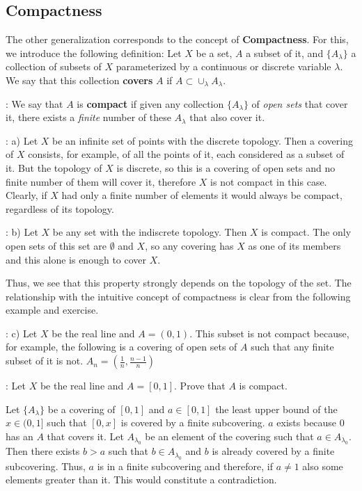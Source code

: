 \subsection{Compactness}

The other generalization corresponds to the concept of {\bf Compactness}.
For this, we introduce the following definition:
Let $X$ be a set, $A$ a subset of it, and $\{ A_{\lambda} \}$
a collection of subsets of $X$ parameterized by a continuous
or discrete variable $\lambda$. We say that this collection {\bf covers}
$A$ if $A \subset \cup_{\lambda}A_{\lambda}$.

: We say that $A$ is {\bf compact} if given any collection
$\{A_{\lambda}\}$ of {\it open sets} that cover it, there exists a {\it finite}
number of these $A_{\lambda}$ that also cover it.

\ejem: a) Let $X$ be an infinite set of points with the discrete topology.
Then a covering of $X$ consists, for example, of all the
points of it, each considered as a subset of it. But the topology of $X$ is
discrete, so this is a covering of open sets and no finite number of them
will cover it, therefore $X$ is not compact in this case.
Clearly, if $X$ had only a finite number of elements
it would always be compact, regardless of its topology.

\ejem: b) Let $X$ be any set with the indiscrete topology.
Then $X$ is compact. The only open sets of this set are
$\emptyset$ and $X$, so any covering has $X$ as
one of its members and this alone is enough to cover $X$.

Thus, we see that this property strongly depends on the topology
of the set. The relationship with the intuitive concept of compactness
is clear from the following example and exercise.

\ejem: c) Let $X$ be the real line and $A = (0,1)$. This subset is not compact
because, for example, the following is a covering of open sets of $A$ such that
any finite subset of it is not. $A_n = (\frac{1}{n}, \frac{n-1}{n})$

\ejer: Let $X$ be the real line and $A = [0,1]$. Prove that $A$ is compact.

\bpru

Let $\{A_{\lambda}\}$ be a covering of $[0,1]$ and $a \in [0,1]$ the least upper bound 
of the $x \in (0,1]$ such that $[0,x]$ is covered by a finite subcovering. 
$a$ exists because $0$ has an $A$ that covers it. Let $A_{\lambda_0}$ be an element of the covering
such that $a \in A_{\lambda_0}$. Then there exists $b > a$ such that $b \in A_{\lambda_0}$ and $b$ is already 
covered by a finite subcovering. Thus, $a$ is in a finite subcovering and therefore,
if $a \neq 1$ also some elements greater than it. This would constitute a contradiction. 
\epru

